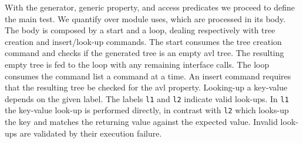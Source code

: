 \documentclass[11pt]{article}
\newcommand{\yap}[1]{\lstinline[style=yap]{#1}}
\begin{document}
With the generator, generic property, and access predicates we proceed to
define the %
main test.
%
We quantify over module uses, which are processed in its body.
%
The body is composed by a start and a loop, dealing respectively with
 tree creation and insert/look-up commands.
%
The start consumes the tree creation command and checks if the generated
tree is an empty avl tree.
%
The resulting empty tree is fed to the loop with any remaining interface
calls.
%
The loop consumes the command list a command at a time.
%
An insert command requires that the resulting tree be checked for the
avl property.
%
%
Looking-up a key-value depends on the given label.
%
The labels \yap{l1} and \yap{l2} indicate valid look-ups.
%
In \yap{l1} the key-value look-up is performed directly, in contrast
with \yap{l2} which looks-up the key and matches the returning value
against the expected value.
%
Invalid look-ups are validated by their execution failure.
\end{document}
